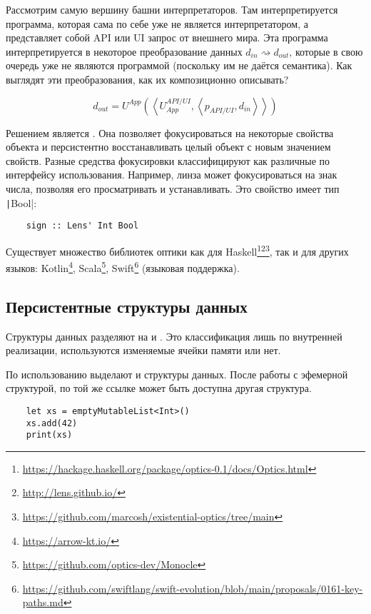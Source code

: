
Рассмотрим самую вершину башни интерпретаторов.
Там интерпретируется программа, которая сама по себе уже не является интерпретатором, а представляет собой API или UI запрос от внешнего мира.
Эта программа интерпретируется в некоторое преобразование данных $d_{in}\rightsquigarrow d_{out}$, которые в свою очередь уже не являются программой (поскольку им не даётся семантика).
Как выглядят эти преобразования, как их композиционно описывать?

\[
    d_{out} =
    U^{App}\left(
    \left<
    U_{App}^{API/UI},
    \left<
    p_{API/UI},
    d_{in}
    \right>
    \right>
    \right)
\]

Решением является .
Она позволяет фокусироваться на некоторые свойства объекта и персистентно восстанавливать целый объект с новым значением свойств.
Разные средства фокусировки классифицируют как различные  по интерфейсу использования.
Например, линза может фокусироваться на знак числа, позволяя его просматривать и устанавливать.
Это свойство имеет тип \texttt|Bool|:
\begin{verbatim}
    sign :: Lens' Int Bool
\end{verbatim}

Существует множество библиотек оптики как для Haskell\footnote{\url{https://hackage.haskell.org/package/optics-0.1/docs/Optics.html}}\footnote{\url{http://lens.github.io/}}\footnote{\url{https://github.com/marcosh/existential-optics/tree/main}}, так и для других языков: Kotlin\footnote{\url{https://arrow-kt.io/}}, Scala\footnote{\url{https://github.com/optics-dev/Monocle}}, Swift\footnote{\url{https://github.com/swiftlang/swift-evolution/blob/main/proposals/0161-key-paths.md}} (языковая поддержка).

\subsection{Персистентные структуры данных}

Структуры данных разделяют на  и .
Это классификация лишь по внутренней реализации, используются изменяемые ячейки памяти или нет.

По использованию выделают  и  структуры данных.
После работы с эфемерной структурой, по той же ссылке может быть доступна другая структура.
\begin{verbatim}
    let xs = emptyMutableList<Int>()
    xs.add(42)
    print(xs)
\end{verbatim}

